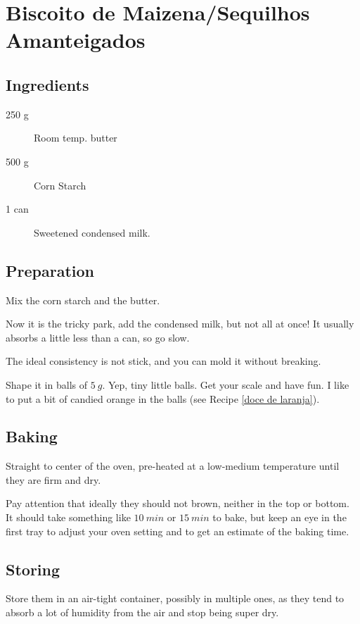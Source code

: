 \setchapterpreamble[u]{\margintoc}
\chapter{Biscoito de Maizena/Sequilhos Amanteigados}

\section{Ingredients}

\begin{multicols}{2}
\begin{description}
	\item[250 g] Room temp. butter
	\item[500 g] Corn Starch
	\item[1 can] Sweetened condensed milk.
\end{description}
\end{multicols}

\section{Preparation}
Mix the corn starch and the butter.

Now it is the tricky park, add the condensed milk, but not all at once!
%
It usually absorbs a little less than a can, so go slow.


The ideal consistency is not stick, and you can mold it without breaking.

Shape it in balls of $5~g$. Yep, tiny little balls. Get your scale and have fun. I like to put a bit of candied orange in the balls (see Recipe \ref{doce de laranja}).

\section{Baking}
Straight to center of the oven, pre-heated at a low-medium temperature until they are firm and dry.

Pay attention that ideally they should not brown, neither in the top or bottom. It should take something like $10~min$ or $15~min$ to bake, but keep an eye in the first tray to adjust your oven setting and to get an estimate of the baking time.

\section{Storing}
Store them in an air-tight container, possibly in multiple ones, as they tend to absorb a lot of humidity from the air and stop being super dry.